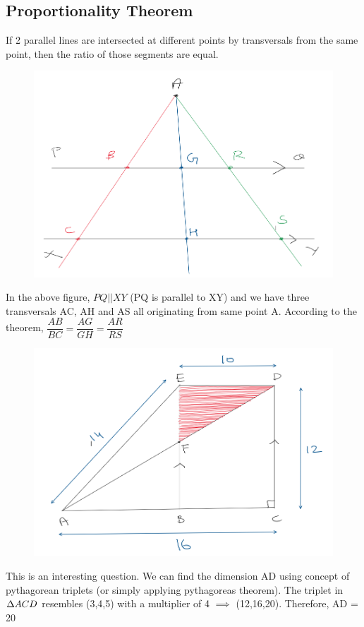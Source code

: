 \newpage

\subsection{Proportionality Theorem}

If 2 parallel lines are intersected at different points by transversals from the same point, then the ratio of those segments are equal.

\begin{figure}[h!]
    \centering
    \includegraphics[width=0.6\linewidth]{Quant//Geometry//Images//Triangles/triangle_12_proportionality_theorem_img.png}
\end{figure}

In the above figure, $PQ || XY$ (PQ is parallel to XY) and we have three transversals AC, AH and AS all originating from same point A. According to the theorem, $\dfrac{AB}{BC} = \dfrac{AG}{GH} = \dfrac{AR}{RS}$

\begin{figure}[h!]
    \centering
    \includegraphics[width=0.5\linewidth]{Quant//Geometry//Images//Triangles/triangle_12_midpt_propo_q1.png}
\end{figure}

This is an interesting question. We can find the dimension AD using concept of pythagorean triplets (or simply applying pythagoreas theorem). The triplet in $\Delta {ACD}$ resembles (3,4,5) with a multiplier of 4 $\implies$ (12,16,20). Therefore, AD = 20 \\

